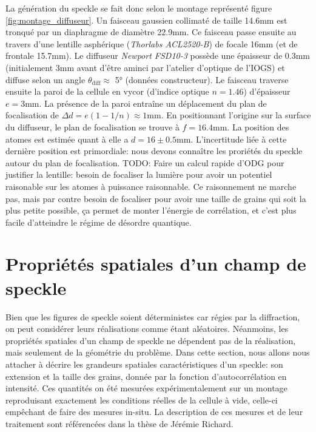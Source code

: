 La génération du speckle se fait donc selon le montage représenté figure \ref{fig:montage_diffuseur}. Un faisceau gaussien collimaté de taille 14.6mm est tronqué par un diaphragme de diamètre 22.9mm. Ce faisceau passe ensuite au travers d'une lentille asphérique (\textit{Thorlabs ACL2520-B}) de focale 16mm (et de frontale 15.7mm). Le diffuseur \textit{Newport FSD10-3} possède une épaisseur de 0.3mm (initialement 3mm avant d'être aminci par l'atelier d'optique de l'IOGS) et diffuse selon un angle $\theta_{\mathrm{diff}}\approx$ 5° (données constructeur). Le faisceau traverse ensuite la paroi de la cellule en vycor (d'indice optique $n=1.46$) d'épaisseur $e=3$mm. La présence de la paroi entraîne un déplacement du plan de focalisation de $\Delta d=e(1-1/n)\approx1$mm. En positionnant l'origine sur la surface du diffuseur, le plan de focalisation se trouve à $f=16.4$mm. La position des atomes est estimée quant à elle a $d=16\pm0.5$mm. L'incertitude liée à cette dernière position est primordiale: nous devons connaître les proriétés du speckle autour du plan de focalisation. 
{\Large TODO: Faire un calcul rapide d'ODG pour justifier la lentille: besoin de focaliser la lumière pour avoir un potentiel raisonable sur les atomes à puissance raisonnable. Ce raisonnement ne marche pas, mais par contre besoin de focaliser pour avoir une taille de grains qui soit la plus petite possible, ça permet de monter l'énergie de corrélation, et c'est plus facile d'atteindre le régime de désordre quantique.}



\section{Propriétés spatiales d'un champ de speckle}
\label{sc:speckle_correlation}
Bien que les figures de speckle soient déterministes car régies par la diffraction, on peut considérer leurs réalisations comme étant aléatoires. Néanmoins, les propriétés spatiales d'un champ de speckle ne dépendent pas de la réalisation, mais seulement de la géométrie du problème. Dans cette section, nous allons nous attacher à décrire les grandeurs spatiales caractéristiques d'un speckle: son extension et la taille des grains, donnée par la fonction d'autocorrélation en intensité. Ces quantités on été mesurées expérimentalement sur un montage reproduisant exactement les conditions réelles de la cellule à vide, celle-ci empêchant de faire des mesures in-situ. La description de ces mesures et de leur traitement sont référencées dans la thèse de Jérémie Richard.

